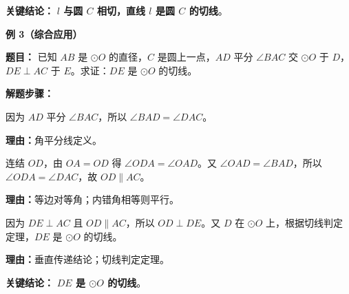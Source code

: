 \begin{examplebox}
	\textbf{\textcolor{CExample}{关键结论：}}
	\textbf{$l$ 与圆 $C$ 相切，直线 $l$ 是圆 $C$ 的切线}。

	\medskip
	\textbf{\textcolor{CExample}{例 3（综合应用）}}

	\textbf{\textcolor{CExample}{题目：}}
	已知 $AB$ 是 $\odot O$ 的直径，$C$ 是圆上一点，$AD$ 平分 $\angle BAC$ 交 $\odot O$ 于 $D$，$DE\perp AC$ 于 $E$。求证：$DE$ 是 $\odot O$ 的切线。

	\textbf{\textcolor{CExample}{解题步骤：}}
	\begin{description}[style=nextline, leftmargin=2.8em, labelsep=0.5em, itemsep=0.45em]
		\item[\textbf{第一步（角平分线条件）：}]因为 $AD$ 平分 $\angle BAC$，所以 $\angle BAD = \angle DAC$。
			\par\textbf{理由：}角平分线定义。
		\item[\textbf{第二步（等腰与平行）：}]连结 $OD$，由 $OA=OD$ 得 $\angle ODA = \angle OAD$。又 $\angle OAD = \angle BAD$，所以 $\angle ODA = \angle DAC$，故 $OD\parallel AC$。
			\par\textbf{理由：}等边对等角；内错角相等则平行。
		\item[\textbf{第三步（垂直与切线）：}]因为 $DE\perp AC$ 且 $OD\parallel AC$，所以 $OD\perp DE$。又 $D$ 在 $\odot O$ 上，根据切线判定定理，$DE$ 是 $\odot O$ 的切线。
			\par\textbf{理由：}垂直传递结论；切线判定定理。
	\end{description}

	\textbf{\textcolor{CExample}{关键结论：}}
	\textbf{$DE$ 是 $\odot O$ 的切线}。
\end{examplebox}
